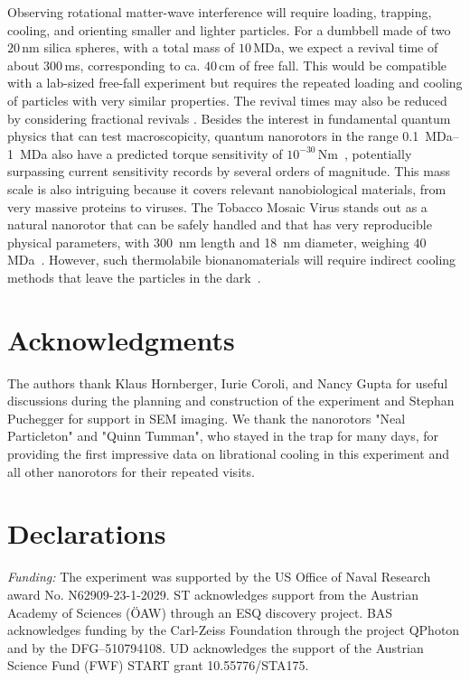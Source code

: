 \documentclass[reprint, amsmath, amssymb, superscriptaddress,showkeys,aps,pra]{revtex4-2}
\begin{document}
Observing rotational matter-wave interference will require loading, trapping, cooling, and orienting smaller and lighter particles. For a dumbbell made of two $20$\,nm silica spheres, with a total mass of $10$\,MDa, we expect a revival time of about $300$\,ms, corresponding to ca. $40$\,cm of free fall. This would be compatible with a lab-sized free-fall experiment but requires the repeated loading and cooling of particles with very similar properties.
The revival times may also be reduced by considering fractional revivals \cite{Dooley2003,Weber2014}.
Besides the interest in fundamental quantum physics that can test macroscopicity, quantum nanorotors in the range \qtyrange{0.1}{1}{MDa} also have a predicted torque sensitivity of $10^{-30}\,\mathrm{Nm}$~\cite{stickler_probing_2018}, potentially surpassing current sensitivity records by several orders of magnitude. This mass scale is also intriguing because it covers relevant nanobiological materials, from very massive proteins to viruses. The Tobacco Mosaic Virus stands out as a natural nanorotor that can be safely handled and that has very reproducible physical parameters, with \qty{300}{nm} length and \qty{18}{nm} diameter, weighing $40$\,MDa~\cite{Butler1984}. However, such thermolabile bionanomaterials will require indirect cooling methods that leave the particles in the dark~\cite{dago_stabilizing_2024}.


\section*{Acknowledgments}
The authors thank Klaus Hornberger, Iurie Coroli, and Nancy Gupta for useful discussions during the planning and construction of the experiment and Stephan Puchegger for support in SEM imaging.
We thank the nanorotors "Neal Particleton" and "Quinn Tumman", who stayed in the trap for many days, for providing the first impressive data on librational cooling in this experiment and all other nanorotors for their repeated visits.
\section*{Declarations}
\noindent
\textit{Funding:}
The experiment was supported by the US Office of Naval Research award No. N62909-23-1-2029.
ST acknowledges support from the Austrian Academy of Sciences (ÖAW) through an ESQ discovery project.
BAS acknowledges funding by the Carl-Zeiss Foundation through the project QPhoton and by the DFG--510794108. 
UD acknowledges the support of the Austrian Science Fund (FWF) START grant 10.55776/STA175.\\
\end{document}
